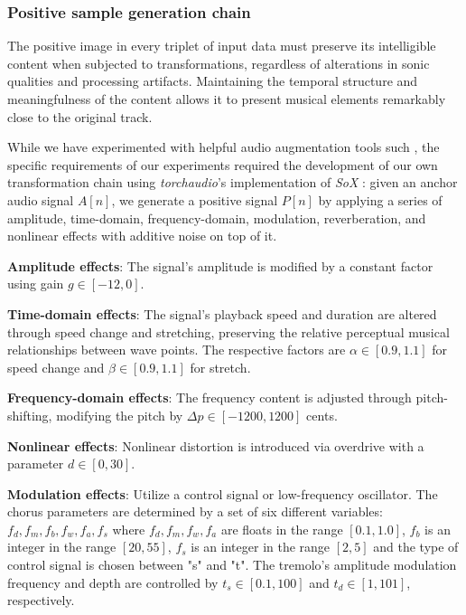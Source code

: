 \subsubsection{Positive sample generation chain}

The positive image in every triplet of input data must preserve its intelligible content when subjected to transformations, regardless of alterations in sonic qualities and processing artifacts. Maintaining the temporal structure and meaningfulness of the content allows it to present musical elements remarkably close to the original track.

While we have experimented with helpful audio augmentation tools such \cite{Spijkervet2021Spijkervet/torchaudio-augmentations:V1.0, Kharitonov2020DataDomain}, the specific requirements of our experiments required the development of our own transformation chain using \textit{torchaudio}'s \cite{Yang2021TorchAudio:Processing} implementation of \textit{SoX} \cite{sox}: given an anchor audio signal $A[n]$, we generate a positive signal $P[n]$ by applying a series of amplitude, time-domain, frequency-domain, modulation, reverberation, and nonlinear effects with additive noise on top of it. 

\textbf{Amplitude effects}: The signal's amplitude is modified by a constant factor using gain $g \in [-12, 0]$.

\textbf{Time-domain effects}: The signal's playback speed and duration are altered through speed change and stretching, preserving the relative perceptual musical relationships between wave points. The respective factors are $\alpha \in [0.9, 1.1]$ for speed change and $\beta \in [0.9, 1.1]$ for stretch.

\textbf{Frequency-domain effects}: The frequency content is adjusted through pitch-shifting, modifying the pitch by $\Delta p \in [-1200, 1200]$ cents.

\textbf{Nonlinear effects}: Nonlinear distortion is introduced via overdrive with a parameter $d \in [0, 30]$.

\textbf{Modulation effects}: Utilize a control signal or low-frequency oscillator. The chorus parameters are determined by a set of six different variables: $f_d, f_m, f_b, f_w, f_a, f_s$ where $f_d, f_m, f_w, f_a$ are floats in the range $[0.1, 1.0]$, $f_b$ is an integer in the range $[20, 55]$, $f_s$ is an integer in the range $[2, 5]$ and the type of control signal is chosen between "s" and "t". The tremolo's amplitude modulation frequency and depth are controlled by $t_s \in [0.1, 100]$ and $t_d \in [1, 101]$, respectively.

